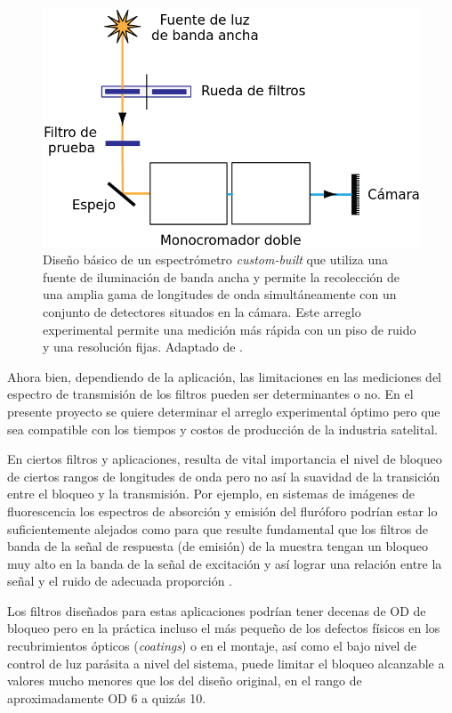 \begin{figure}[H]
	\centering
	\includegraphics[scale=0.8]{Figs/plan_de_tesis/med_mets_prevs.png}
	\caption{Diseño básico de un espectrómetro \textit{custom-built} que 
	utiliza una fuente de iluminación de banda ancha y permite la recolección 
	de una 		amplia gama de
		longitudes de onda simultáneamente con un conjunto de detectores 
		situados en la cámara. Este 
		arreglo experimental permite una medición más rápida con un piso de 
		ruido y una resolución fijas. Adaptado de 
		\cite{Semrock}.}
	\label{fig:med_prev}
\end{figure}




Ahora bien, dependiendo de la aplicación, las limitaciones en las mediciones 
del espectro de transmisión de los filtros pueden ser determinantes o no. En el 
presente proyecto se quiere determinar el arreglo experimental óptimo pero que 
sea compatible con los tiempos y costos de producción de la industria satelital.

En ciertos filtros y aplicaciones, resulta de vital importancia 
el 
nivel de bloqueo de ciertos rangos de longitudes de onda pero no así la 
suavidad de la transición entre el bloqueo y la transmisión. Por ejemplo, en 
sistemas de 
imágenes de fluorescencia los espectros de absorción y emisión del fluróforo 
podrían estar lo suficientemente alejados como para que resulte fundamental que 
los filtros de banda de la señal de respuesta (de emisión) de la muestra tengan 
un bloqueo muy alto en la banda de la señal de excitación y así lograr una 
relación entre la señal y el ruido de adecuada proporción \cite{Grecco2016}. 

Los filtros 
diseñados para estas aplicaciones podrían tener decenas de OD de bloqueo pero 
en 
la práctica incluso el más pequeño de los defectos físicos en los 
recubrimientos ópticos (\textit{coatings}) o en el montaje, así como el bajo 
nivel de control de luz parásita a nivel del sistema, puede limitar el 
bloqueo alcanzable a valores mucho menores que los del diseño original, en el 
rango de aproximadamente OD 6 a quizás 10.%

